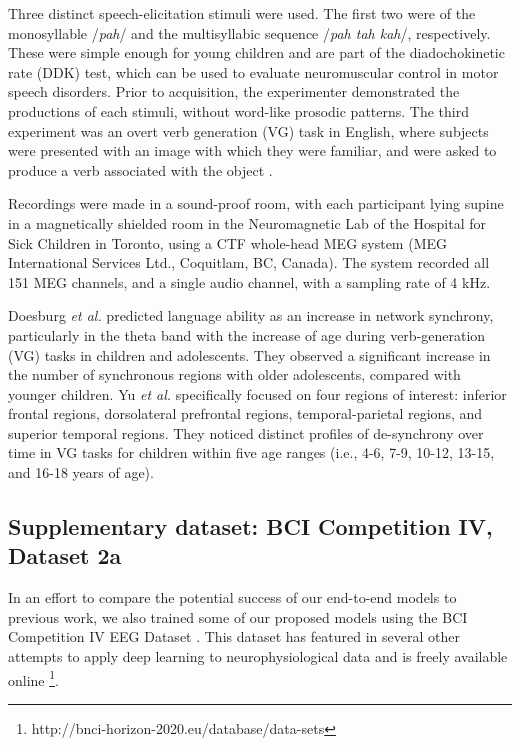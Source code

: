 \documentclass[utf8]{frontiersSCNS} %
\begin{document}
Three distinct speech-elicitation stimuli were used. The first two were of the monosyllable /{\em pah}/ and the multisyllabic sequence /{\em pah tah kah}/, respectively. These were simple enough for young children and are part of the diadochokinetic rate (DDK) test, which can be used to evaluate neuromuscular control in motor speech disorders. Prior to acquisition, the experimenter demonstrated the productions of each stimuli, without word-like prosodic patterns. The third experiment was an overt verb generation (VG) task in English, where subjects were presented with an image with which they were familiar, and were asked to produce a verb associated with the object \cite{Doesburg2016}.

Recordings were made in a sound-proof room, with each participant lying supine in a magnetically shielded room in the Neuromagnetic Lab of the Hospital for Sick Children in Toronto, using a CTF whole-head MEG system (MEG International Services Ltd., Coquitlam, BC, Canada). The system recorded all 151 MEG channels, and a single audio channel, with a sampling rate of 4 kHz.

Doesburg {\em et al.} \cite{Doesburg2016} predicted language ability as an increase in network synchrony, particularly in the theta band with the increase of age during verb-generation (VG) tasks in children and adolescents. They observed a significant increase in the number of synchronous regions with older adolescents, compared with younger children. Yu {\em et al.} \cite{Yu2014} specifically focused on four regions of interest: inferior frontal regions, dorsolateral prefrontal regions, temporal-parietal regions, and superior temporal regions. They noticed distinct profiles of de-synchrony over time in VG tasks for children within five age ranges (i.e., 4-6, 7-9, 10-12, 13-15, and 16-18 years of age).

\subsection{Supplementary dataset: BCI Competition IV, Dataset 2a}

In an effort to compare the potential success of our end-to-end models to previous work, we also trained some of our proposed models using the BCI Competition IV EEG Dataset \cite{Tangermann2012}. This dataset has featured in several other attempts to apply deep learning to neurophysiological data and is freely available online \footnote{http://bnci-horizon-2020.eu/database/data-sets}.
\end{document}
